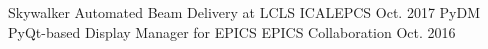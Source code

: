 \begin{cvhonors}
  \cvhonor
    {Skywalker}
    {Automated Beam Delivery at LCLS}
    {ICALEPCS}
    {Oct. 2017}
  \cvhonor
    {PyDM}
    {PyQt-based Display Manager for EPICS}
    {EPICS Collaboration}
    {Oct. 2016}
\end{cvhonors}
